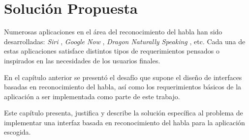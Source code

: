 \chapter{Soluci\'on Propuesta}
\label{sec:solucion}

Numerosas aplicaciones en el \'area del reconocimiento del habla han sido desarrolladas: 
\emph{Siri} \cite{AppleSiri}, \emph{Google Now} \cite{GoogleNow}, 
\emph{Dragon Naturally Speaking} \cite{DragonNaturallySpeaking}, etc. Cada una de estas
aplicaciones satisface distintos tipos de requerimientos pensados o inspirados en las necesidades de los usuarios finales. 

En el cap\'itulo anterior se presentó el desafío que supone el diseño de interfaces basadas 
en reconocimiento del habla, así como los requerimientos básicos de la aplicación a ser implementada como 
parte de este trabajo.

Este cap\'itulo presenta, justifica y describe la soluci\'on espec\'ifica al problema de implementar 
una interfaz basada en reconocimiento del habla para la aplicaci\'on escogida.






